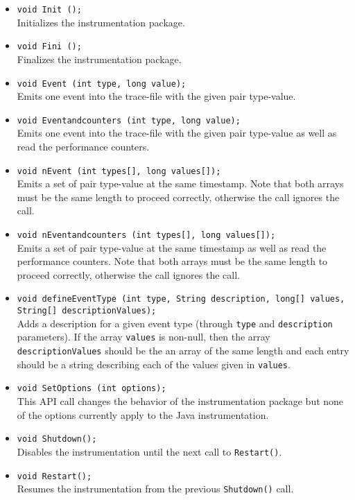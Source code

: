 \begin{itemize}

  \item \texttt{void Init ();}\\
  Initializes the instrumentation package.

  \item \texttt{void Fini ();}\\
  Finalizes the instrumentation package.

  \item \texttt{void Event (int type, long value);}\\
  Emits one event into the trace-file with the given pair type-value.

  \item \texttt{void Eventandcounters (int type, long value);}\\
  Emits one event into the trace-file with the given pair type-value as well as read the performance counters.

  \item \texttt{void nEvent (int types[], long values[]);}\\
  Emits a set of pair type-value at the same timestamp. Note that both arrays must be the same length to proceed correctly, otherwise the call ignores the call.

  \item \texttt{void nEventandcounters (int types[], long values[]);}\\
  Emits a set of pair type-value at the same timestamp as well as read the performance counters. Note that both arrays must be the same length to proceed correctly, otherwise the call ignores the call.


  \item \texttt{void defineEventType (int type, String description, long[] values, String[] descriptionValues);}\\
  Adds a description for a given event type (through \texttt{type} and \texttt{description} parameters). If the array \texttt{values} is non-null, then the array \texttt{descriptionValues} should be the an array of the same length and each entry should be a string describing each of the values given in \texttt{values}.

  \item \texttt{void SetOptions (int options);}\\
  This API call changes the behavior of the instrumentation package but none of the options currently apply to the Java instrumentation.

  \item \texttt{void Shutdown();}\\
  Disables the instrumentation until the next call to \texttt{Restart()}.

  \item \texttt{void Restart();}\\
  Resumes the instrumentation from the previous \texttt{Shutdown()} call.

\end{itemize}

